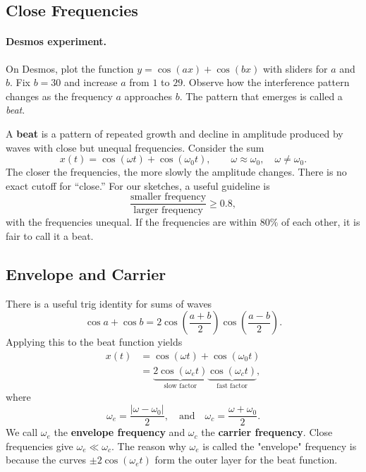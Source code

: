 \documentclass[10pt,letterpaper]{article}
\begin{document}
\subsection{Close Frequencies}

\paragraph{Desmos experiment.}
On Desmos, plot the function $y=\cos(ax)+\cos(bx)$ with sliders for $a$ and $b$.
Fix $b=30$ and increase $a$ from $1$ to $29$. Observe how the interference pattern changes as the frequency $a$ approaches $b$. The pattern that emerges is called a \textit{beat}.

A \textbf{beat} is a pattern of repeated growth and decline
in amplitude produced by waves with close but unequal
frequencies. Consider the sum
\[
x(t)=\cos(\omega t)+\cos(\omega_0t),
\qquad \omega\approx\omega_0,\quad \omega\ne\omega_0.
\]
The closer the frequencies, the more slowly the amplitude
changes. There is no exact cutoff for ``close.'' For our sketches,
a useful guideline is
\[
\frac{\text{smaller frequency}}{\text{larger frequency}}
\ge 0.8,
\]
with the frequencies unequal. If the frequencies are within $80\%$ of each other, it is fair to call it a beat.

\subsection{Envelope and Carrier}

There is a useful trig identity for sums of waves
\[
\cos a+\cos b
=2\cos\left(\frac{a+b}{2}\right)
  \cos\left(\frac{a-b}{2}\right).
\]
Applying this to the beat function yields 
\begin{align*}
x(t)&=\cos(\omega t)+\cos(\omega_0t)\\
&=\underbrace{2\cos(\omega_e t)}_{\text{slow factor}}
\underbrace{\cos(\omega_c t)}_{\text{fast factor}},
\end{align*}
where
\[
\omega_e=\frac{|\omega-\omega_0|}{2},
\quad\text{and}\quad
\omega_c=\frac{\omega+\omega_0}{2}.
\]
We call $\omega_e$ the \textbf{envelope frequency}
and $\omega_c$ the \textbf{carrier frequency}.
Close frequencies give $\omega_e\ll\omega_c$. The reason why $\omega_e$ is called the "envelope" frequency is because the curves $\pm2\cos(\omega_e t)$ form the outer layer for the beat function.

\end{document}
